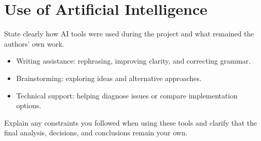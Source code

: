 \section{Use of Artificial Intelligence}

State clearly how AI tools were used during the project and what remained the authors' own work.

\begin{itemize}
  \item Writing assistance: rephrasing, improving clarity, and correcting grammar.
  \item Brainstorming: exploring ideas and alternative approaches.
  \item Technical support: helping diagnose issues or compare implementation options.
\end{itemize}

Explain any constraints you followed when using these tools and clarify that the final analysis, decisions, and conclusions remain your own.
